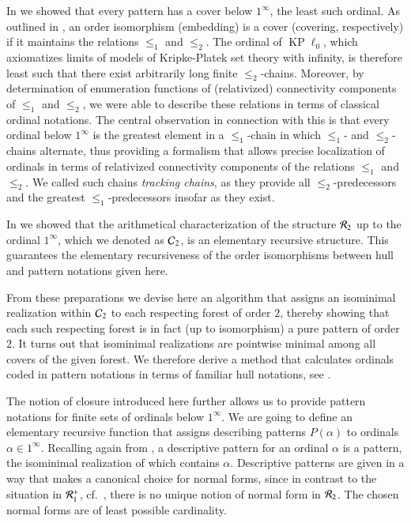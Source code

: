 \documentclass[3p,10pt,times]{elsarticle}
\newcommand{\al}{\alpha}
\newcommand{\leo}{\le_1}
\newcommand{\kplnod}{{\operatorname{KP}\!\ell_0}}
\newcommand{\Rtwo}{{{\cal R}_2}}
\newcommand{\Ctwo}{{{\cal C}_2}}
\newcommand{\Ronepl}{{{\cal R}_1^+}}
\newcommand{\oneinf}{1^\infty}
\newcommand{\letwo}{\le_2}
\begin{document}
In \cite{CWc} we showed that every pattern has a cover below $1^\infty$, the least such ordinal.
As outlined in \cite{W}, an order isomorphism (embedding) is a cover (covering, respectively) 
if it maintains the relations $\le_1$ and $\le_2$.
The ordinal of $\kplnod$, which axiomatizes limits of models of Kripke-Platek set theory with infinity, 
is therefore least such that there exist arbitrarily long finite $\le_2$-chains.
Moreover, by determination of enumeration functions of (relativized) connectivity components of $\le_1$ and $\le_2$, we
were able to describe these relations in terms of classical ordinal notations. The central observation in connection with
this is that every ordinal below $1^\infty$ is the greatest element in a $\le_1$-chain in which $\le_1$- and $\le_2$-chains alternate,
thus providing a formalism that allows precise localization of ordinals in terms of relativized connectivity components of the
relations $\leo$ and $\letwo$.
We called such chains \emph{tracking chains}, as they provide all $\le_2$-predecessors and the greatest $\le_1$-predecessors
insofar as they exist. 

In \cite{W} we showed that the arithmetical characterization of the structure $\Rtwo$ up to the ordinal $\oneinf$, which we denoted
as $\Ctwo$\index{$\Ctwo$}, is an elementary recursive structure. This guarantees the elementary recursiveness of the order isomorphisms between
hull and pattern notations given here.

From these preparations we devise here an algorithm that assigns an isominimal realization within $\Ctwo$ to each respecting forest
of order $2$, thereby showing that each such respecting forest is in fact (up to isomorphism)
a pure pattern of order $2$. It turns out that isominimal realizations are pointwise minimal among all covers of the given forest.
We therefore derive a method that calculates ordinals coded in pattern notations in terms of familiar hull notations, see \cite{W07a}.

The notion of closure introduced here further allows us to provide pattern notations for finite sets of ordinals below $\oneinf$.
We are going to define an elementary recursive function that assigns describing patterns $P(\al)$ to
ordinals $\al\in 1^\infty$. Recalling again from \cite{W}, a descriptive pattern 
for an ordinal $\al$ is a pattern, the isominimal realization of which contains $\al$. 
Descriptive patterns are given in a way that makes a canonical choice for normal
forms, since in contrast to the situation in $\Ronepl$, cf.\ \cite{W07c,CWa}, there is no unique notion of normal form in $\Rtwo$.
The chosen normal forms are of least possible cardinality.
\end{document}

